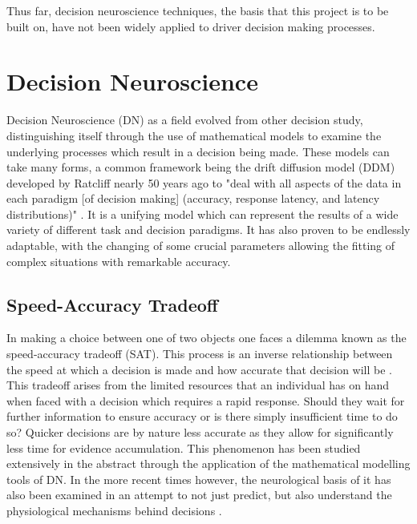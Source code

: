Thus far, decision neuroscience techniques, the basis that this project is to be built on, have not been widely applied to driver decision making processes.

\section{Decision Neuroscience}
Decision Neuroscience (DN) as a field evolved from other decision study, distinguishing itself through the use of mathematical models to examine the underlying processes which result in a decision being made. These models can take many forms, a common framework being the drift diffusion model (DDM) developed by Ratcliff nearly 50 years ago to "deal with all aspects of the data in each paradigm [of decision making] (accuracy, response latency, and latency distributions)" \citep{ratcliffTheoryMemoryRetrieval1978}. It is a unifying model which can represent the results of a wide variety of different task and decision paradigms. It has also proven to be endlessly adaptable, with the changing of some crucial parameters allowing the fitting of complex situations with remarkable accuracy. 

\subsection{Speed-Accuracy Tradeoff}
In making a choice between one of two objects one faces a dilemma known as the speed-accuracy tradeoff (SAT). This process is an inverse relationship between the speed at which a decision is made and how accurate that decision will be \citep{spieserDecisionMotorContribution2017,bogaczNeuralBasisSpeed2010}. This tradeoff arises from the limited resources that an individual has on hand when faced with a decision which requires a rapid response. Should they wait for further information to ensure accuracy or is there simply insufficient time to do so? Quicker decisions are by nature less accurate as they allow for significantly less time for evidence accumulation. This phenomenon has been studied extensively in the abstract through the application of the mathematical modelling tools of DN. In the more recent times however, the neurological basis of it has also been examined in an attempt to not just predict, but also understand the physiological mechanisms behind decisions \citep{goldNeuralBasisDecision2007a,heitzNeuralMechanismsSpeedAccuracy2012}.

